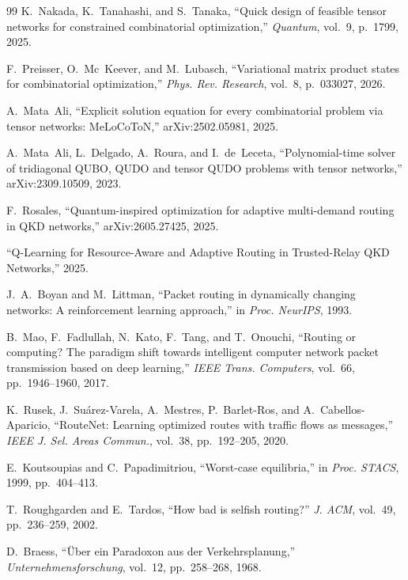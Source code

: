 \documentclass[twocolumn]{article}
\begin{document}
\begin{thebibliography}{99}
K.~Nakada, K.~Tanahashi, and S.~Tanaka,
``Quick design of feasible tensor networks for constrained
combinatorial optimization,''
\emph{Quantum}, vol.~9, p.~1799, 2025.

F.~Preisser, O.~Mc~Keever, and M.~Lubasch,
``Variational matrix product states for combinatorial optimization,''
\emph{Phys. Rev. Research}, vol.~8, p.~033027, 2026.

A.~Mata~Ali, ``Explicit solution equation for every combinatorial
problem via tensor networks: MeLoCoToN,''
arXiv:2502.05981, 2025.

A.~Mata~Ali, L.~Delgado, A.~Roura, and I.~de~Leceta,
``Polynomial-time solver of tridiagonal QUBO, QUDO and tensor QUDO
problems with tensor networks,''
arXiv:2309.10509, 2023.

F.~Rosales, ``Quantum-inspired optimization for adaptive multi-demand
routing in QKD networks,''
arXiv:2605.27425, 2025.

``Q-Learning for Resource-Aware and Adaptive Routing in Trusted-Relay
QKD Networks,'' 2025.

J.~A.~Boyan and M.~Littman,
``Packet routing in dynamically changing networks: A reinforcement
learning approach,''
in \emph{Proc. NeurIPS}, 1993.

B.~Mao, F.~Fadlullah, N.~Kato, F.~Tang, and T.~Onouchi,
``Routing or computing? The paradigm shift towards intelligent computer
network packet transmission based on deep learning,''
\emph{IEEE Trans. Computers}, vol.~66, pp.~1946--1960, 2017.

K.~Rusek, J.~Su\'arez-Varela, A.~Mestres, P.~Barlet-Ros, and
A.~Cabellos-Aparicio, ``RouteNet: Learning optimized routes with
traffic flows as messages,''
\emph{IEEE J. Sel. Areas Commun.}, vol.~38, pp.~192--205, 2020.

E.~Koutsoupias and C.~Papadimitriou,
``Worst-case equilibria,''
in \emph{Proc. STACS}, 1999, pp.~404--413.

T.~Roughgarden and E.~Tardos,
``How bad is selfish routing?''
\emph{J. ACM}, vol.~49, pp.~236--259, 2002.

D.~Braess, ``\"Uber ein Paradoxon aus der Verkehrsplanung,''
\emph{Unternehmensforschung}, vol.~12, pp.~258--268, 1968.


\end{thebibliography}
\end{document}
